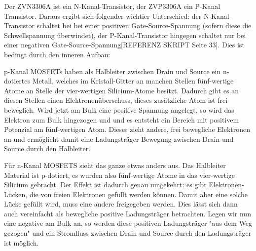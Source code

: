 Der ZVN3306A ist ein N-Kanal-Transistor, der ZVP3306A ein P-Kanal Transistor. Daraus ergibt sich folgender wichtier Unterschied: der N-Kanal-Transistor schaltet bei bei einer positiven Gate-Source-Spannung (sofern diese die Schwellspannung überwindet), der P-Kanal-Transistor hingegen schaltet nur bei einer negativen Gate-Source-Spannung[REFERENZ SKRIPT Seite 33]. Dies ist bedingt durch den inneren Aufbau:

p-Kanal MOSFETs haben als Halbleiter zwischen Drain und Source ein n-dotiertes Metall, welches im Kristall-Gitter an manchen Stellen fünf-wertige Atome an Stelle der vier-wertigen Silicium-Atome besitzt. Dadurch gibt es an diesen Stellen einen Elektronenüberschuss, dieses zusätzliche Atom ist frei beweglich. Wird jetzt am Bulk eine positive Spannung angelegt, so wird das Elektron zum Bulk hingezogen und und es entsteht ein Bereich mit positivem Potenzial am fünf-wertigen Atom. Dieses zieht andere, frei bewegliche Elektronen an und ermöglicht damit eine Ladungsträger Bewegung zwischen Drain und Source durch den Halbleiter.

Für n-Kanal MOSFETS sieht das ganze etwas anders aus. Das Halbleiter Material ist p-dotiert, es wurden also fünf-wertige Atome in das vier-wertige Silicium gebracht. Der Effekt ist dadurch genau umgekehrt: es gibt Elektronen-Lücken, die von freien Elektronen gefüllt werden können. Damit aber eine solche Lücke gefüllt wird, muss eine andere freigegeben werden. Dies lässt sich dann auch vereinfacht als bewegliche positive Ladungsträger betrachten. Legen wir nun eine negative am Bulk an, so werden diese positiven Ladungsträger "aus dem Weg gezogen" und ein Stromfluss zwischen Drain und Source durch den Ladungsträger ist möglich.